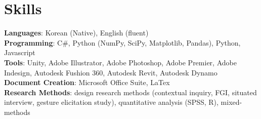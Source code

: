 \documentclass[letterpaper,11pt]{article} %
\begin{document}
\begin{comment}
This section is compressed from the various skills sections that Euro CV
recommends.
\end{comment}

\section{Skills}
 \begin{itemize}[leftmargin=0.5cm, label={}]
    \small{\item{
     \textbf{Languages}{: Korean (Native), English (fluent)} \\
     \textbf{Programming}{: C\#, Python (NumPy, SciPy, Matplotlib, Pandas), Python, Javascript} \\
     \textbf{Tools}{: Unity, Adobe Illustrator, Adobe Photoshop, Adobe Premier, Adobe Indesign, Autodesk Fushion 360, Autodesk Revit, Autodesk Dynamo} \\
     \textbf{Document Creation}{: Microsoft Office Suite, LaTex} \\
     \textbf{Research Methods}{: design research methods (contextual inquiry, FGI, situated interview, gesture elicitation study), quantitative analysis (SPSS, R), mixed-methods} \\
    }}
 \end{itemize}
    
\end{document}
